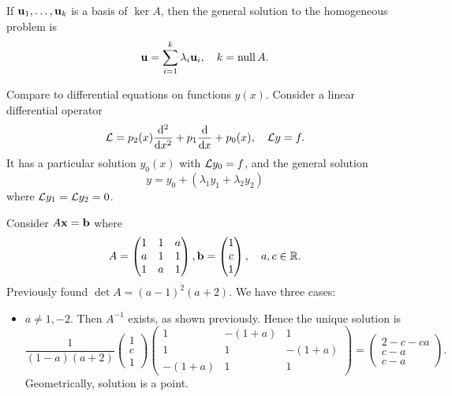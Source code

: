 \documentclass[10pt]{article}
\DeclareMathOperator{\nullity}{null}
\begin{document}
    If $ {\bf u}_1,\dots,{\bf u}_k $ is a basis of $ \ker A $, then the general solution to the homogeneous problem is 
    \[
        \bfu= \sum_{i=1}^{k}\lambda_i \bfu_i, \quad k=\nullity A
    .\]
    \begin{remark}
        Compare to differential equations on functions $y(x)$. Consider a linear differential operator 
        \[
            {\mathcal{L}}= p_2(x)\frac{\mathrm{d}^2}{\mathrm{d}x^2}+p_1 \frac{\mathrm{d}}{\mathrm{d}x} +p_0(x),\quad {\mathcal{L}} y=f 
        .\]
        It has a particular solution $y_0(x)$ with $ {\mathcal{L}} y_0=f $, and the general solution 
        \[
            y=y_0+(\lambda_1 y_1+\lambda_2 y_2)
        \]
        where ${\mathcal{L}} y_1={\mathcal{L}} y_2=0$.
    \end{remark}
    \begin{example}
        Consider $A{\bf x}={\bf b}$ where
        \[
            A=\begin{pmatrix}
                1&1&a\\
                a&1&1\\
                1&a&1
            \end{pmatrix}, {\bf b}=\begin{pmatrix}
                1\\c\\1
            \end{pmatrix},\quad a,c\in \mathbb{R}.
        \]
        Previously found $ \det A=(a-1)^2(a+2) $. We have three cases:
        \begin{itemize}
            \item \underline{$a\neq 1,-2$}. Then $A^{-1}$ exists, as shown previously. Hence the unique solution is 
            \[
                \frac{1}{(1-a)(a+2)}
            \begin{pmatrix}
                    1\\c\\1
                \end{pmatrix}
               \begin{pmatrix}
                    1&-(1+a) & 1 \\
                    1 & 1&-(1+a) \\
                    -(1+a)& 1 & 1
            \end{pmatrix}
            =\begin{pmatrix}
                2-c-ca\\c-a\\c-a
            \end{pmatrix}
            .\]
            Geometrically, solution is a point.

\end{itemize}
\end{example}
\end{document}
